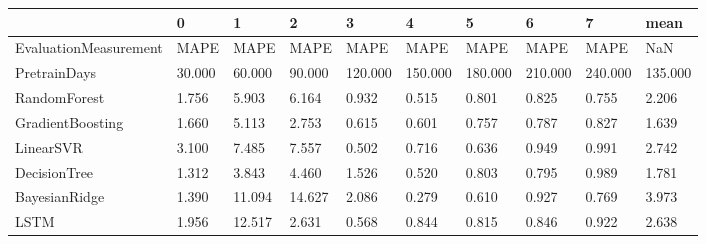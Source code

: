 \begin{tabular}{llllllllll}
\toprule
{} &      0 &      1 &      2 &       3 &       4 &       5 &       6 &       7 &    mean \\
\midrule
EvaluationMeasurement &   MAPE &   MAPE &   MAPE &    MAPE &    MAPE &    MAPE &    MAPE &    MAPE &     NaN \\
PretrainDays          & 30.000 & 60.000 & 90.000 & 120.000 & 150.000 & 180.000 & 210.000 & 240.000 & 135.000 \\
RandomForest          &  1.756 &  5.903 &  6.164 &   0.932 &   0.515 &   0.801 &   0.825 &   0.755 &   2.206 \\
GradientBoosting      &  1.660 &  5.113 &  2.753 &   0.615 &   0.601 &   0.757 &   0.787 &   0.827 &   1.639 \\
LinearSVR             &  3.100 &  7.485 &  7.557 &   0.502 &   0.716 &   0.636 &   0.949 &   0.991 &   2.742 \\
DecisionTree          &  1.312 &  3.843 &  4.460 &   1.526 &   0.520 &   0.803 &   0.795 &   0.989 &   1.781 \\
BayesianRidge         &  1.390 & 11.094 & 14.627 &   2.086 &   0.279 &   0.610 &   0.927 &   0.769 &   3.973 \\
LSTM                  &  1.956 & 12.517 &  2.631 &   0.568 &   0.844 &   0.815 &   0.846 &   0.922 &   2.638 \\
\bottomrule
\end{tabular}
